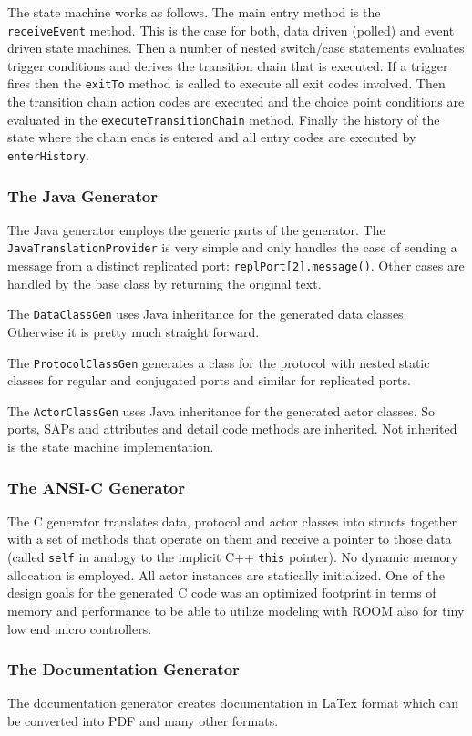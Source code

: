 The state machine works as follows. The main entry method is the \\ \texttt{receiveEvent} method. This is 
the case for both, data driven (polled) and event driven state machines. Then a number of nested 
switch/case statements evaluates trigger conditions and derives the transition chain that is executed. If 
a trigger fires then the \texttt{exitTo} method is called to execute all exit codes involved. Then the 
transition chain action codes are executed and the choice point conditions are evaluated in the 
\texttt{executeTransitionChain} method. Finally the history of the state where the chain ends is entered 
and all entry codes are executed by \texttt{enterHistory}.

\subsubsection{The Java Generator}

The Java generator employs the generic parts of the generator. The \texttt{JavaTranslationProvider} is 
very simple and only handles the case of sending a message from a distinct replicated port: 
\texttt{replPort[2].message()}. Other cases are handled by the base class by returning the original text.

The \texttt{DataClassGen} uses Java inheritance for the generated data classes. Otherwise it is pretty 
much straight forward.

The \texttt{ProtocolClassGen} generates a class for the protocol with nested static classes for regular 
and conjugated ports and similar for replicated ports.

The \texttt{ActorClassGen} uses Java inheritance for the generated actor classes. So ports, SAPs and 
attributes and detail code methods are inherited. Not inherited is the state machine implementation.

\subsubsection{The ANSI-C Generator}

The C generator translates data, protocol and actor classes into structs together with a set of methods 
that operate on them and receive a pointer to those data (called \texttt{self} in analogy to the implicit 
C++ \texttt{this} pointer).
No dynamic memory allocation is employed. All actor instances are statically initialized.
One of the design goals for the generated C code was an optimized footprint in terms of memory and 
performance to be able to utilize modeling with ROOM also for tiny low end micro controllers.

\subsubsection{The Documentation Generator}

The documentation generator creates documentation in LaTex format which can be converted into PDF and many 
other formats.

